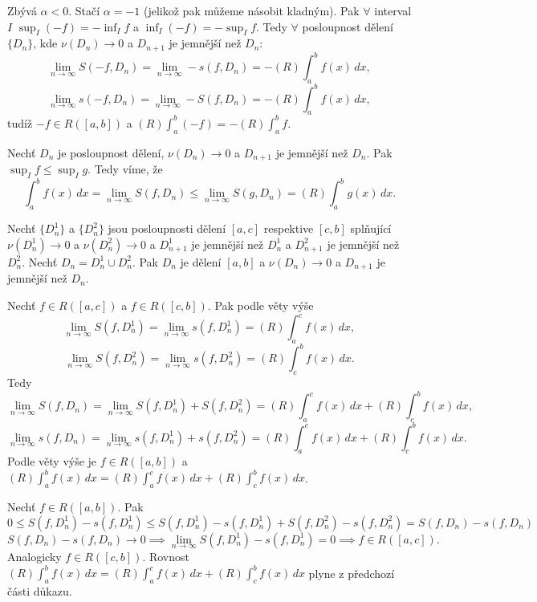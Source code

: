 \documentclass[12pt]{article}                   %
\begin{document}
\begin{veta}
\begin{dukazin}[a]
                Zbývá $\alpha < 0$. Stačí $\alpha = -1$ (jelikož pak můžeme násobit kladným). Pak $\forall$ interval $I$ $\sup_I (-f) = -\inf_I f$ a $\inf_I(-f) = -\sup_I f$. Tedy $\forall$ posloupnost dělení $\{D_n\}$, kde $\nu(D_n) \rightarrow 0$ a $D_{n+1}$ je jemnější než $D_n$:
                $$ \lim_{n \rightarrow ∞} S(-f, D_n) = \lim_{n \rightarrow ∞} - s(f, D_n) = - (R)\int_a^b f(x)\,dx, $$ 
                $$ \lim_{n \rightarrow ∞} s(-f, D_n) = \lim_{n \rightarrow ∞} - S(f, D_n) = - (R)\int_a^b f(x)\,dx, $$
                tudíž $-f \in R([a, b])$ a $(R)\int_a^b (-f) = -(R)\int_a^b f$.
            \end{dukazin}

            \begin{dukazin}[b]
                Nechť $D_n$ je posloupnost dělení, $\nu(D_n) \rightarrow 0$ a $D_{n+1}$ je jemnější než $D_n$. Pak $\sup_I f ≤ \sup_I g$. Tedy víme, že
                $$ \int_a^b f(x)\,dx = \lim_{n \rightarrow ∞} S(f, D_n) ≤ \lim_{n \rightarrow ∞} S(g, D_n) = (R)\int_a^b g(x)\,dx. $$
            \end{dukazin}

            \begin{dukazin}[c]
                Nechť $\{D_n^1\}$ a $\{D_n^2\}$ jsou posloupnosti dělení $[a, c]$ respektive $[c, b]$ splňující $\nu(D_n^1) \rightarrow 0$ a $\nu(D_n^2) \rightarrow 0$ a $D^1_{n+1}$ je jemnější než $D^1_n$ a $D^2_{n+1}$ je jemnější než $D^2_n$. Nechť $D_n = D_n^1 \cup D_n^2$. Pak $D_n$ je dělení $[a, b]$ a $\nu(D_n) \rightarrow 0$ a $D_{n+1}$ je jemnější než $D_n$.

                Nechť $f\in R([a, c])$ a $f \in R([c, b])$. Pak podle věty výše
                $$ \lim_{n \rightarrow ∞} S(f, D_n^1) = \lim_{n \rightarrow ∞} s(f, D_n^1) = (R)\int_a^c f(x)\,dx, $$
                $$ \lim_{n \rightarrow ∞} S(f, D_n^2) = \lim_{n \rightarrow ∞} s(f, D_n^2) = (R)\int_c^b f(x)\,dx. $$
                Tedy
                $$ \lim_{n \rightarrow ∞} S(f, D_n) = \lim_{n \rightarrow ∞} S(f, D_n^1) + S(f, D_n^2) = (R) \int_a^c f(x)\,dx + (R)\int_c^b f(x)\,dx, $$
                $$ \lim_{n \rightarrow ∞} s(f, D_n) = \lim_{n \rightarrow ∞} s(f, D_n^1) + s(f, D_n^2) = (R) \int_a^c f(x)\,dx + (R)\int_c^b f(x)\,dx. $$
                Podle věty výše je $f \in R([a, b])$ a $(R) \int_a^b f(x)\,dx = (R) \int_a^c f(x)\,dx + (R)\int_c^b f(x)\,dx$.

                Nechť $f \in R([a, b])$. Pak
                $$ 0 ≤ S(f, D_n^1) - s(f, D_n^1) ≤ S(f, D_n^1) - s(f, D_n^1) + S(f, D_n^2) - s(f, D_n^2) = S(f, D_n) - s(f, D_n) $$
                $$ S(f, D_n) - s(f, D_n) \rightarrow 0 \implies \lim_{n \rightarrow ∞} S(f, D_n^1) - s(f, D_n^1) = 0 \implies f \in R([a, c]). $$
                Analogicky $f \in R([c, b])$. Rovnost $(R) \int_a^b f(x)\,dx = (R) \int_a^c f(x)\,dx + (R) \int_c^b f(x)\,dx$ plyne z předchozí části důkazu.
            \end{dukazin}
        \end{veta}
\end{document}
